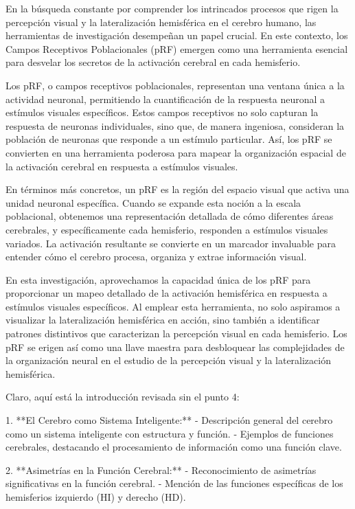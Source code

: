 \documentclass[12pt,oneside]{uhthesis}
\begin{document}
En la búsqueda constante por comprender los intrincados procesos que rigen la percepción visual y la lateralización hemisférica en el cerebro humano, las herramientas de investigación desempeñan un papel crucial. En este contexto, los Campos Receptivos Poblacionales (pRF) emergen como una herramienta esencial para desvelar los secretos de la activación cerebral en cada hemisferio.

Los pRF, o campos receptivos poblacionales, representan una ventana única a la actividad neuronal, permitiendo la cuantificación de la respuesta neuronal a estímulos visuales específicos. Estos campos receptivos no solo capturan la respuesta de neuronas individuales, sino que, de manera ingeniosa, consideran la población de neuronas que responde a un estímulo particular. Así, los pRF se convierten en una herramienta poderosa para mapear la organización espacial de la activación cerebral en respuesta a estímulos visuales.

En términos más concretos, un pRF es la región del espacio visual que activa una unidad neuronal específica. Cuando se expande esta noción a la escala poblacional, obtenemos una representación detallada de cómo diferentes áreas cerebrales, y específicamente cada hemisferio, responden a estímulos visuales variados. La activación resultante se convierte en un marcador invaluable para entender cómo el cerebro procesa, organiza y extrae información visual.

En esta investigación, aprovechamos la capacidad única de los pRF para proporcionar un mapeo detallado de la activación hemisférica en respuesta a estímulos visuales específicos. Al emplear esta herramienta, no solo aspiramos a visualizar la lateralización hemisférica en acción, sino también a identificar patrones distintivos que caracterizan la percepción visual en cada hemisferio. Los pRF se erigen así como una llave maestra para desbloquear las complejidades de la organización neural en el estudio de la percepción visual y la lateralización hemisférica.
\newpage

Claro, aquí está la introducción revisada sin el punto 4:

1. **El Cerebro como Sistema Inteligente:**
- Descripción general del cerebro como un sistema inteligente con estructura y función.
- Ejemplos de funciones cerebrales, destacando el procesamiento de información como una función clave.

2. **Asimetrías en la Función Cerebral:**
- Reconocimiento de asimetrías significativas en la función cerebral.
- Mención de las funciones específicas de los hemisferios izquierdo (HI) y derecho (HD).
\end{document}
